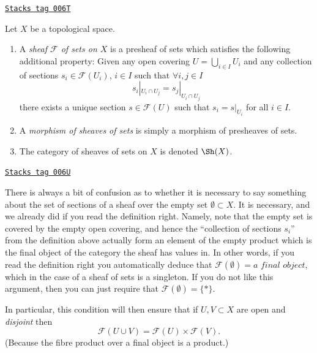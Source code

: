 \begin{definition}[Sheaf]
\label{sheaves-definition-sheaf}
\href{https://stacks.math.columbia.edu/tag/006T}{\texttt{Stacks tag 006T}}

Let $X$ be a topological space.
\begin{enumerate}
\item A {\it sheaf $\mathcal{F}$ of sets on $X$} is a presheaf
of sets which satisfies the following additional property: Given
any open covering $U = \bigcup_{i \in I} U_i$ and any collection
of sections $s_i \in \mathcal{F}(U_i)$, $i \in I$ such that
$\forall i, j\in I$
$$
s_i|_{U_i \cap U_j} = s_j|_{U_i \cap U_j}
$$
there exists a unique section $s \in \mathcal{F}(U)$ such that
$s_i = s|_{U_i}$ for all $i \in I$.
\item A {\it morphism of sheaves of sets} is simply a
morphism of presheaves of sets.
\item The category of sheaves of sets on $X$ is denoted
$\Sh(X)$.
\end{enumerate}
\end{definition}

\begin{remark}[Confusion]
\label{sheaves-remark-confusion}
\href{https://stacks.math.columbia.edu/tag/006U}{\texttt{Stacks tag 006U}}

There is always a bit of confusion as to whether it is
necessary to say something about the set of sections of
a sheaf over the empty set $\emptyset \subset X$.
It is necessary, and we already did if you read the
definition right. Namely, note that the empty set is
covered by the empty open covering, and hence the ``collection
of sections $s_i$'' from the definition above actually form
an element of the empty product which is the final object
of the category the sheaf has values in. In other words,
if you read the definition right you automatically deduce
that $\mathcal{F}(\emptyset) = \textit{a final object}$,
which in the case of a sheaf of sets is a singleton.
If you do not like this argument, then you can just require
that $\mathcal{F}(\emptyset) = \{*\}$.

\medskip\noindent
In particular, this condition will then ensure that if
$U, V \subset X$ are open and {\it disjoint} then
$$
\mathcal{F}(U \cup V) = \mathcal{F}(U) \times \mathcal{F}(V).
$$
(Because the fibre product over a final object is a product.)
\end{remark}

